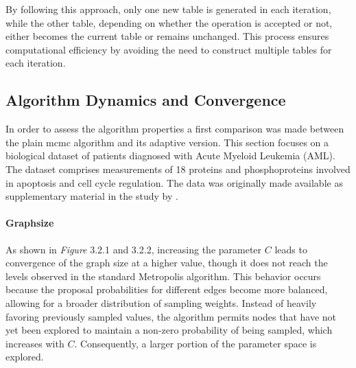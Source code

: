 \documentclass{report}
\begin{document}
By following this approach, only one new table is generated in each iteration, while the other table, depending on whether the operation is accepted or not, either becomes the current table or remains unchanged. This process ensures computational efficiency by avoiding the need to construct multiple tables for each iteration.

\subsection{Algorithm Dynamics and Convergence}

In order to assess the algorithm properties a first comparison was made between the plain mcmc algorithm and its adaptive version. This section focuses on a biological dataset of patients diagnosed with Acute Myeloid Leukemia (AML). The dataset comprises measurements of 18 proteins and phosphoproteins involved in apoptosis and cell cycle regulation. The data was originally made available as supplementary material in the study by \citet{kornblau2009functional}.

\paragraph{Graphsize}

As shown in \textit{Figure} 3.2.1 and 3.2.2, increasing the parameter $C$ leads to convergence of the graph size at a higher value, though it does not reach the levels observed in the standard Metropolis algorithm. This behavior occurs because the proposal probabilities for different edges become more balanced, allowing for a broader distribution of sampling weights. Instead of heavily favoring previously sampled values, the algorithm permits nodes that have not yet been explored to maintain a non-zero probability of being sampled, which increases with $C$. Consequently, a larger portion of the parameter space is explored.
\end{document}
